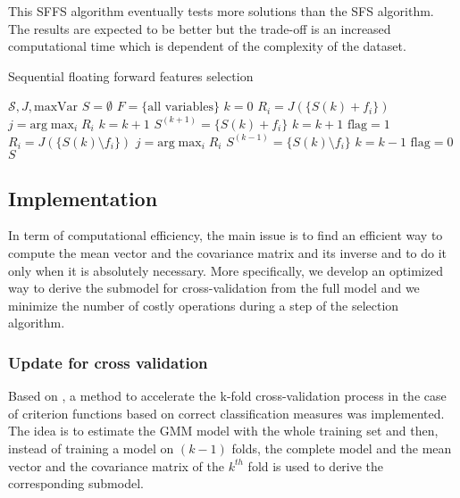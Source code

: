 \documentclass[a4paper,11pt,DIV=16]{scrartcl}
\begin{document}
    This SFFS algorithm eventually tests more solutions than the SFS algorithm. The results are expected to be better but the trade-off is an increased computational time which is dependent of the complexity of the dataset.

    \begin{algorithm}
    \caption{Sequential floating forward features selection\label{alg:sffs}}
    \begin{algorithmic}[1]
    \REQUIRE $\mathcal{S},J,\text{maxVar}$
    \STATE $S=\emptyset$
    \STATE $F=\text{\{all variables\}}$
    \STATE $k=0$
    \STATE $R_i = J(\{S{(k)} + f_i\})$
    \ENDFOR
    \STATE $j=\text{arg} \max_{i} R_i$
    \STATE $k=k+1$
    \ELSE
    \STATE $S^{(k+1)} = \{S{(k)} + f_i\}$
    \STATE $k=k+1$
    \STATE $\text{flag}=1$
    \STATE $R_i = J(\{S{(k)}\setminus f_i\})$
    \ENDFOR
    \STATE $j=\text{arg} \max_{i} R_i$
    \STATE $S^{(k-1)} = \{S{(k)} \setminus f_i\}$
    \STATE $k=k-1$
    \ELSE
    \STATE $\text{flag}=0$
    \ENDIF
    \ENDWHILE
    \ENDIF
    \ENDWHILE
    \RETURN $S$
    \end{algorithmic}
    \end{algorithm}

    \subsection{Implementation}
    In term of computational efficiency, the main issue is to find an efficient way to compute the mean vector and the covariance matrix and its inverse and to do it only when it is absolutely necessary. More specifically, we develop an optimized way to derive the submodel for cross-validation from the full model and we minimize the number of costly operations during a step of the selection algorithm.

        \subsubsection{Update for cross validation}

        Based on \cite{fauvel2015fast}, a method to accelerate the k-fold cross-validation process in the case of criterion functions based on correct classification measures was implemented. The idea is to estimate the GMM model with the whole training set and then, instead of training a model on $(k-1)$ folds, the complete model and the mean vector and the covariance matrix of the $k^{th}$ fold is used to derive the corresponding submodel.
\end{document}

